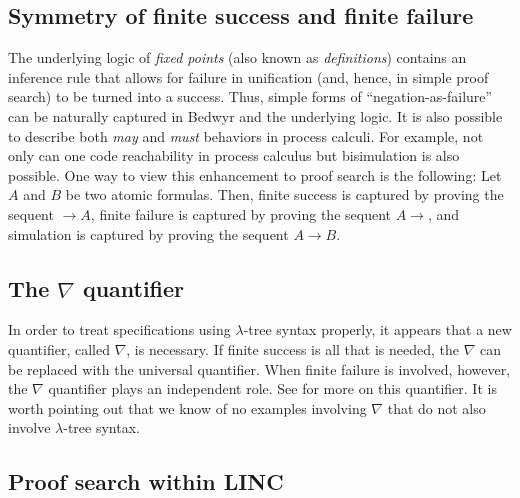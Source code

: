 \subsection{Symmetry of finite success and finite failure}

The underlying logic of \emph{fixed points} (also known as
\emph{definitions})
\cite{girard92mail,schroeder-Heister93lics,mcdowell03tcs,momigliano03types}
contains an inference rule that allows for failure in unification (and,
hence, in simple proof search) to be turned into a success.  Thus,
simple forms of ``negation-as-failure'' can be naturally captured in
Bedwyr and the underlying logic.  It is also possible to describe both
\emph{may} and \emph{must} behaviors in process calculi.  For example,
not only can one code reachability in process calculus but bisimulation
is also possible.  One way to view this enhancement to proof search is
the following: Let $A$ and $B$ be two atomic formulas.  Then, finite
success is captured by proving the sequent $\longrightarrow A$, finite
failure is captured by proving the sequent $A\longrightarrow$, and
simulation is captured by proving the sequent $A\longrightarrow B$.

\subsection{The \texorpdfstring{$\nabla$}{nabla} quantifier}

In order to treat specifications using $\lambda$-tree syntax properly,
it appears that a new quantifier, called $\nabla$, is necessary.  If
finite success is all that is needed, the $\nabla$ can be replaced with
the universal quantifier.  When finite failure is involved, however, the
$\nabla$ quantifier plays an independent role.  See
\cite{miller05tocl,tiu04phd,tiu05concur} for more on this quantifier.
It is worth pointing out that we know of no examples involving $\nabla$
that do not also involve $\lambda$-tree syntax.

\subsection{Proof search within LINC}
\label{psearch}


